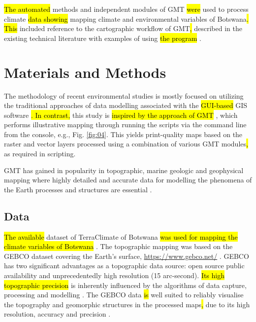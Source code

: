 \documentclass[ijgi,article,submit,pdftex,moreauthors]{Definitions/mdpi}
\begin{document}
\hl{The automated} methods and independent modules of GMT\hl{ were }used to process climate \hl{data showing } mapping climate and environmental variables of Botswana\hl{. This }included reference to the cartographic workflow of GMT\hl{, }described in the existing technical literature with examples of using\hl{ the program} \cite{Kasalica,Lemenkova2019106,Lemenkova202205,Lemenkova201994}. 

\section{Materials and Methods}

The methodology of recent environmental studies is mostly focused on utilizing the traditional approaches of data modelling associated with the \hl{GUI-based} GIS software \cite{Kolawole,Lemenkova202206,Ringrose1996,Lindh2021a,Manisa,Lemenkova202141,Ringrose1999,Lemenkova202125,Pachka,Pricope,Lemenkova202021}\hl{. In contrast, }this study is \hl{inspired by the approach of GMT} \cite{Wessel}, which performs illustrative mapping through running the scripts via the command line from the console, e.g., Fig. \ref{fig:04}. This yields print-quality maps based on the raster and vector layers processed using a combination of various GMT modules\hl{, }as required in scripting. 

GMT has gained in popularity in topographic, marine geologic and geophysical mapping where highly detailed and accurate data for modelling the phenomena of the Earth processes and structures are essential \cite{Virden,Lemenkova202127,Senturk,Lemenkova202017,Lindh202208,Lemenkova202018,Shietal2009}.  

\subsection{Data}
	\hl{The available} dataset of TerraClimate of Botswana \hl{was used for mapping the climate variables of Botswana} \cite{Abatzoglou}. The topographic mapping was based on the GEBCO dataset covering the Earth's surface, \href{https://www.gebco.net/}{https://www.gebco.net/} \cite{Ermel,Schenke2016}. GEBCO has two significant advantages as a topographic data source: open source public availability and unprecedentedly high resolution (15 arc-second). \hl{Its high topographic precision} is inherently influenced by the algorithms of data capture, processing and modelling\hl{ }\cite{Bracke,Smith,Lemenkova202211}. The GEBCO data \hl{is} well suited to reliably visualise the topography and geomorphic structures in the processed maps\hl{, }due to its high resolution, accuracy and precision \cite{Jakobsson,Lemenkova202112,Hall,Lemenkova202012,Marks}. 
	
\end{document}
